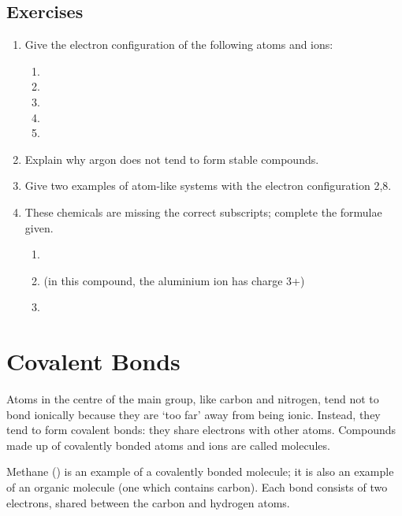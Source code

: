 \documentclass[a4paper]{memoir}
\begin{document}
\subsection*{Exercises}
\begin{enumerate}
  \item Give the electron configuration of the following atoms and ions:
    \begin{enumerate}
      \item {}
      \item {}
      \item {}
      \item {}
      \item {}
    \end{enumerate}
  \item Explain why argon does not tend to form stable compounds.
  \item Give two examples of atom-like systems with the electron configuration 2,8.
  \item These chemicals are missing the correct subscripts; complete the formulae given.
    \begin{enumerate}
      \item {}
      \item {} (in this compound, the aluminium ion has charge 3+)
      \item {}
    \end{enumerate}
\end{enumerate}

\section{Covalent Bonds}
Atoms in the centre of the main group, like carbon and nitrogen, tend not to bond ionically because they are `too far' away from being ionic.
Instead, they tend to form covalent bonds: they share electrons with other atoms. Compounds made up of covalently bonded atoms and ions are
called molecules.

\begin{center}
\end{center}

Methane () is an example of a covalently bonded molecule; it is also an example of an organic molecule (one which contains carbon). Each
bond consists of two electrons, shared between the carbon and hydrogen atoms.

\begin{center}
\end{center}
\end{document}
